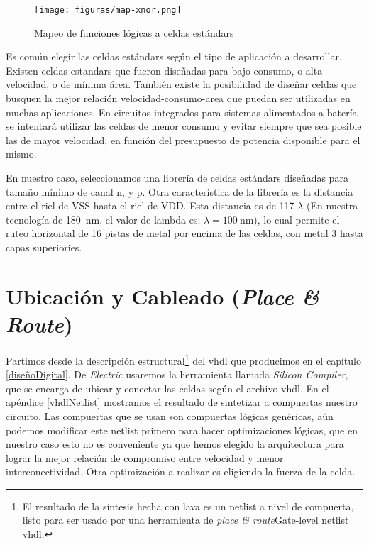 
\begin{figure}[h]
\centering
\texttt{[image: figuras/map-xnor.png]}
  \caption{Mapeo de funciones lógicas a celdas estándars}
  \label{fig:map-xnor}
\end{figure}

Es común elegir las celdas estándars según el tipo de aplicación a desarrollar. Existen celdas estandars que fueron diseñadas para bajo consumo, o alta velocidad, o de mínima área. También existe la posibilidad de diseñar celdas que busquen la mejor relación velocidad-consumo-area que puedan ser utilizadas en muchas aplicaciones. En circuitos integrados para sistemas alimentados a batería se intentará utilizar las celdas de menor consumo y evitar siempre que sea posible las de mayor velocidad, en función del presupuesto de potencia disponible para el mismo.

En nuestro caso, seleccionamos una librería de celdas estándars diseñadas para tamaño mínimo de canal n, y p. %
Otra característica de la librería es la distancia entre el riel de VSS hasta el riel de VDD. Esta distancia es de 117 $\lambda$ (En nuestra tecnología de 180~$\mathrm{nm}$, el valor de lambda es: $\lambda = 100~\mathrm{nm}$), lo cual permite el ruteo horizontal de 16 pistas de metal por encima de las celdas, con metal 3 hasta capas superiories.

 


\section{Ubicación y Cableado (\emph{Place \& Route})}
Partimos desde la descripción estructural\footnote{El resultado de la síntesis hecha con lava es un netlist a nivel de compuerta, listo para ser usado por una herramienta de \emph{place \& route}Gate-level netlist vhdl.} del vhdl que producimos en el capítulo \ref{diseñoDigital}. De \emph{Electric} usaremos la herramienta llamada \emph{Silicon Compiler}, que se encarga de ubicar y conectar las celdas según el archivo vhdl. En el apéndice \ref{vhdlNetlist} mostramos el resultado de sintetizar a compuertas nuestro circuito. Las compuertas que se usan son compuertas lógicas genéricas, aún podemos modificar este netlist primero para hacer optimizaciones lógicas, que en nuestro caso esto no es conveniente ya que hemos elegido la arquitectura para lograr la mejor relación de compromiso entre velocidad y menor interconectividad. Otra optimización a realizar es eligiendo la fuerza de la celda.



